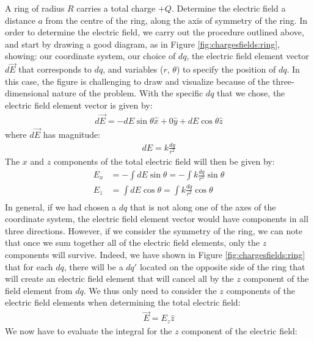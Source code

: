 \begin{example}{\label{ex:chargesfields:ring}A ring of radius $R$ carries a total charge $+Q$. Determine the electric field a distance $a$ from the centre of the ring, along the axis of symmetry of the ring.}
In order to determine the electric field, we carry out the procedure outlined above, and start by drawing a good diagram, as in Figure \ref{fig:chargesfields:ring}, showing: our coordinate system, our choice of $dq$, the electric field element vector $d\vec E$ that corresponds to $dq$, and variables ($r$, $\theta$) to specify the position of $dq$.
In this case, the figure is challenging to draw and visualize because of the three-dimensional nature of the problem. With the specific $dq$ that we chose, the electric field element vector is given by:
\begin{align*}
d\vec E = -dE\sin\theta \hat x + 0\hat y + dE\cos\theta \hat z 
\end{align*}
where $d\vec E$ has magnitude:
\begin{align*}
dE = k\frac{dq}{r^2}
\end{align*}
The $x$ and $z$ components of the total electric field will then be given by:
\begin{align*}
E_x &= -\int dE\sin\theta=-\int k\frac{dq}{r^2}\sin\theta\\
E_z &= \int dE\cos\theta=\int k\frac{dq}{r^2}\cos\theta \\
\end{align*}
In general, if we had chosen a $dq$ that is not along one of the axes of the coordinate system, the electric field element vector would have components in all three directions. However, if we consider the symmetry of the ring, we can note that once we sum together all of the electric field elements, only the $z$ components will survive. Indeed, we have shown in Figure \ref{fig:chargesfields:ring} that for each $dq$, there will be a $dq'$ located on the opposite side of the ring that will create an electric field element that will cancel all by the $z$ component of the field element from $dq$. We thus only need to consider the $z$ components of the electric field elements when determining the total electric field:
\begin{align*}
\vec E = E_z\hat z
\end{align*}
We now have to evaluate the integral for the $z$ component of the electric field:

\end{example}
